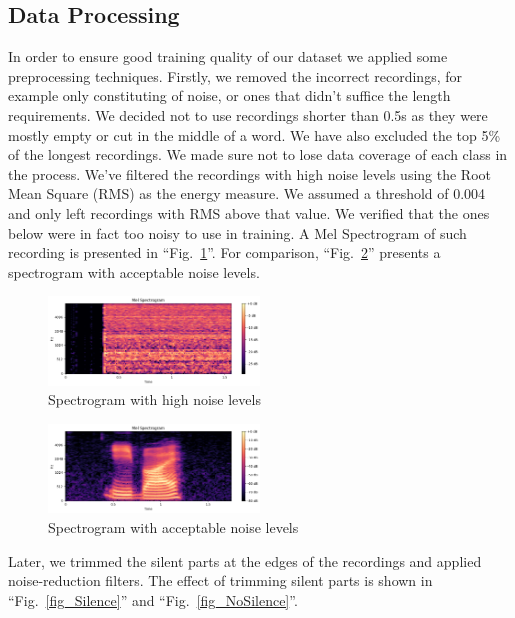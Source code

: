 \documentclass[conference]{IEEEtran}
\begin{document}
\subsection{Data Processing}
In order to ensure good training quality of our dataset we applied some preprocessing techniques. Firstly, we removed the incorrect recordings, for example only constituting of noise, or ones that didn't suffice the length requirements. We decided not to use recordings shorter than 0.5s as they were mostly empty or cut in the middle of a word. We have also excluded the top 5\% of the longest recordings. We made sure not to lose data coverage of each class in the process.
We've filtered the recordings with high noise levels using the Root Mean Square (RMS) as the energy measure. We assumed a threshold of 0.004 and only left recordings with RMS above that value. We verified that the ones below were in fact too noisy to use in training. A Mel Spectrogram of such recording is presented in ``Fig.~\ref{fig_Noise}''. For comparison, ``Fig.~\ref{fig_NoNoise}'' presents a spectrogram with acceptable noise levels.

\begin{figure}[htbp]
    \centerline{\includegraphics[width=0.5\textwidth]{Figures/Fig_Noise.png}}
    \caption{Spectrogram with high noise levels}
    \label{fig_Noise} %
    \end{figure}

\begin{figure}[htbp]
    \centerline{\includegraphics[width=0.5\textwidth]{Figures/Fig_NoNoise.png}}
    \caption{Spectrogram with acceptable noise levels}
    \label{fig_NoNoise} %
    \end{figure}

Later, we trimmed the silent parts at the edges of the recordings and applied noise-reduction filters. The effect of trimming silent parts is shown in ``Fig.~\ref{fig_Silence}'' and ``Fig.~\ref{fig_NoSilence}''.
\end{document}

